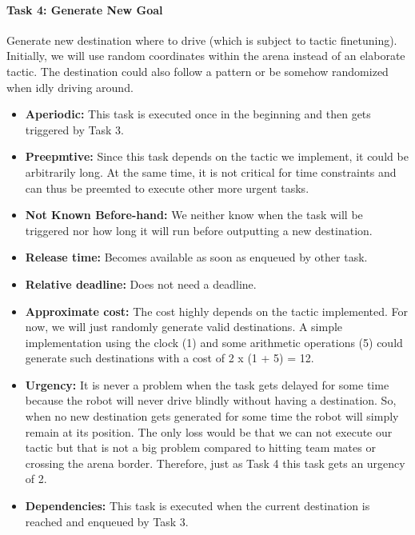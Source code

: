 \documentclass[12pt]{article}
\begin{document}
\paragraph{Task 4: Generate New Goal}   
Generate new destination where to drive (which is subject to tactic finetuning). Initially, we will use random coordinates within the arena instead of an elaborate tactic. The destination could also follow a pattern or be somehow randomized when idly driving around.
  \begin{itemize}
	\item \textbf{Aperiodic:} This task is executed once in the beginning and then gets triggered by Task 3.
	\item \textbf{Preepmtive:} Since this task depends on the tactic we implement, it could be arbitrarily long. At the same time, it is not critical for time constraints and can thus be preemted to execute other more urgent tasks.
  	\item \textbf{Not Known Before-hand:} We neither know when the task will be triggered nor how long it will run before outputting a new destination.
  	\item \textbf{Release time:} Becomes available as soon as enqueued by other task.
  	\item \textbf{Relative deadline:} Does not need a deadline.
  	\item \textbf{Approximate cost:} The cost highly depends on the tactic implemented. For now, we will just randomly generate valid destinations. A simple implementation using the clock (1) and some arithmetic operations (5) could generate such destinations with a cost of 2 x (1 + 5) = 12. 
  	\item \textbf{Urgency:} It is never a problem when the task gets delayed for some time because the robot will never drive blindly without having a destination. So, when no new destination gets generated for some time the robot will simply remain at its position. The only loss would be that we can not execute our tactic but that is not a big problem compared to hitting team mates or crossing the arena border. Therefore, just as Task 4 this task gets an urgency of 2.
  	\item \textbf{Dependencies:} This task is executed when the current destination is reached and enqueued by Task 3.
   	\end{itemize}
   	
\end{document}
